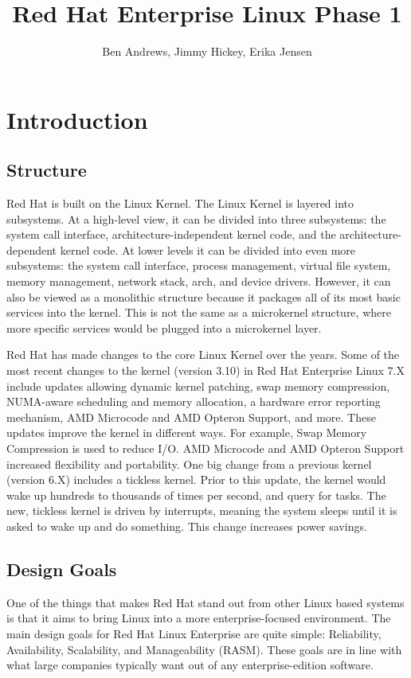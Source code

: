 \documentclass[12pt]{article}
\title{Red Hat Enterprise Linux Phase 1}
\author{Ben Andrews, Jimmy Hickey, Erika Jensen}
\begin{document}
\maketitle
\tableofcontents
\clearpage

\doublespacing
\section{Introduction}
\subsection{Structure}
Red Hat is built on the Linux Kernel. The Linux Kernel is layered into subsystems. At a high-level view, it can be divided into three subsystems: the system call interface, architecture-independent kernel code, and the architecture-dependent kernel code. At lower levels it can be divided into even more subsystems:  the system call interface, process management, virtual file system, memory management, network stack, arch, and device drivers. However, it can also be viewed as a monolithic structure because it packages all of its most basic services into the kernel. This is not the same as a microkernel structure, where more specific services would be plugged into a microkernel layer.

Red Hat has made changes to the core Linux Kernel over the years. Some of the most recent changes to the kernel (version 3.10) in Red Hat Enterprise Linux 7.X include updates allowing dynamic kernel patching, swap memory compression, NUMA-aware scheduling and memory allocation, a hardware error reporting mechanism, AMD Microcode and AMD Opteron Support, and more. These updates improve the kernel in different ways. For example, Swap Memory Compression is used to reduce I/O. AMD Microcode and AMD Opteron Support increased flexibility and portability. One big change from a previous kernel (version 6.X) includes a tickless kernel. Prior to this update, the kernel would wake up hundreds to thousands of times per second, and query for tasks. The new, tickless kernel is driven by interrupts, meaning the system sleeps until it is asked to wake up and do something. This change increases power savings.

\subsection{Design Goals}
One of the things that makes Red Hat stand out from other Linux based systems is that it aims to bring Linux into a more enterprise-focused environment. The main design goals for Red Hat Linux Enterprise are quite simple: Reliability, Availability, Scalability, and Manageability (RASM). These goals are in line with what large companies typically want out of any enterprise-edition software. 
\end{document}
